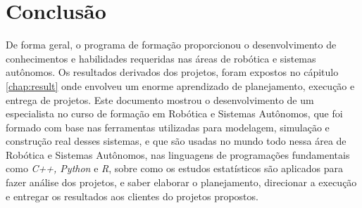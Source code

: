 \chapter{Conclusão}
\label{chap:conc}

De forma geral, o programa de formação proporcionou o desenvolvimento de conhecimentos e habilidades requeridas nas áreas de robótica e sistemas autônomos. Os resultados derivados dos projetos, foram expostos no cápitulo \ref{chap:result} onde envolveu um enorme aprendizado de planejamento, execução e entrega de projetos.
Este documento mostrou o desenvolvimento de um especialista no curso de formação em Robótica e Sistemas Autônomos, que foi formado com base nas ferramentas utilizadas para modelagem, simulação e construção real desses sistemas, e que são usadas no mundo todo nessa área de Robótica e Sistemas Autônomos, nas linguagens de programações fundamentais como \textit{C++, Python} e \textit{R}, sobre como os estudos estatísticos são aplicados para fazer análise dos projetos, e saber elaborar o planejamento, direcionar a execução e entregar os resultados aos clientes do projetos propostos. 

